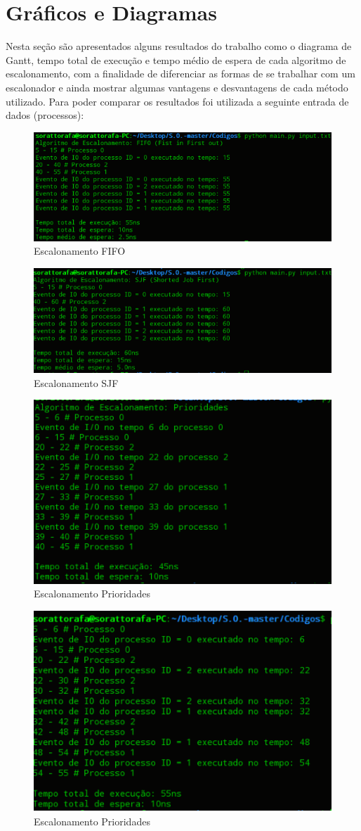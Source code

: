 \documentclass[times, 10pt,twocolumn]{article}
\begin{document}
\section{Gráficos e Diagramas}
Nesta seção são apresentados alguns resultados do trabalho como o diagrama de Gantt\cite{tanenbaum}, tempo total de execução e tempo médio de espera de cada algoritmo de escalonamento, com a finalidade de diferenciar as formas de se trabalhar com um escalonador e ainda mostrar algumas vantagens e desvantagens de cada método utilizado. Para poder comparar os resultados foi utilizada a seguinte entrada de dados (processos): 

\begin{figure}[!htb]
    \centering
    \includegraphics[width=.5\textwidth]{figuras/fifo}
    \caption{Escalonamento FIFO}
    \label{fig:figura-001}
\end{figure}   
 
\begin{figure}[!htb]
	\centering
	\includegraphics[width=.5\textwidth]{figuras/sjf}
	\caption{Escalonamento SJF}
	\label{fig:figura-002}
\end{figure}  


\begin{figure}[!htb]
	\centering
	\includegraphics[width=.4\textwidth]{figuras/priori}
	\caption{Escalonamento Prioridades}
	\label{fig:figura-003}
\end{figure} 

\begin{figure}[!htb]
	\centering
	\includegraphics[width=.4\textwidth]{figuras/rr}
	\caption{Escalonamento Prioridades}
	\label{fig:figura-004}
\end{figure}
\end{document}
